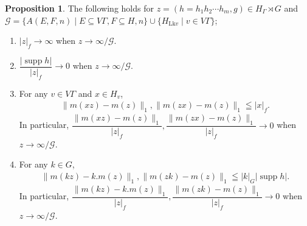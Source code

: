 \documentclass{amsart}
\theoremstyle{definition}
\newtheorem{proposition}[theorem]{Proposition}
\renewcommand{\subset}{\subseteq}
\begin{document}
\begin{proposition}
The following holds for $z=(h=h_1h_2\cdots h_m, g)\in H_{\Gamma}\rtimes G$ and
$\mathcal{G}=\{ A(E, F, n) \mid E\subset V\Gamma, F\subset H, n\} \cup\{ H_{\mathrm{Lk}v}\mid v\in V\Gamma\}$; 
\begin{enumerate}
\item $|z|_f\to \infty$ when $z\to \infty/\mathcal{G}$. 

\item $\dfrac{|\mathop{supp}h|}{|z|_f} \to 0$ when $z\to \infty/\mathcal{G}$. 

\item For any $v\in V\Gamma$ and $x\in H_v$, 
\begin{align}
\| m(xz)-m(z) \|_1, \| m(zx)-m(z) \|_1 \leqq |x|_f.  
\end{align}
In particular, $\dfrac{\| m(xz)-m(z) \|_1}{|z|_f}, \dfrac{\| m(zx)-m(z) \|_1}{|z|_f} \to 0$ when $z\to \infty/\mathcal{G}$.
\item For any $k\in G$, 
\begin{align}
\| m(kz)-k.m(z) \|_1, \| m(zk)-m(z) \|_1\leqq |k|_G|\mathop{supp}h|. 
\end{align}
In particular, $\dfrac{\| m(kz)-k.m(z) \|_1}{|z|_f}, \dfrac{\| m(zk)-m(z) \|_1}{|z|_f} \to 0$ when $z\to \infty/\mathcal{G}$.
\end{enumerate}
\end{proposition}
\end{document}
